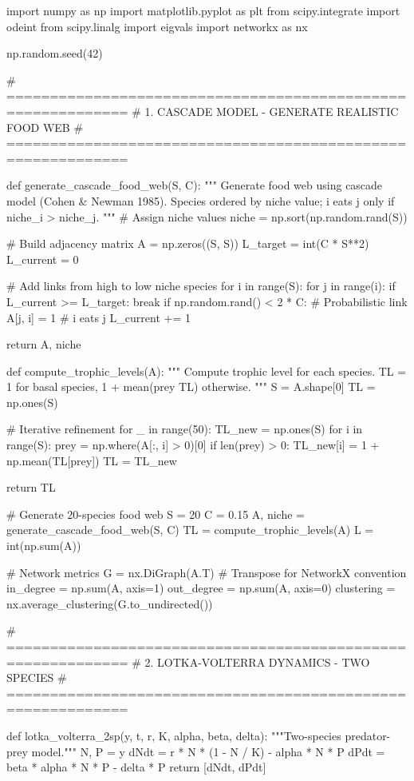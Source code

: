 \documentclass[a4paper, 11pt]{article}
\begin{document}
\begin{pycode}
import numpy as np
import matplotlib.pyplot as plt
from scipy.integrate import odeint
from scipy.linalg import eigvals
import networkx as nx

np.random.seed(42)

# ============================================================
# 1. CASCADE MODEL - GENERATE REALISTIC FOOD WEB
# ============================================================

def generate_cascade_food_web(S, C):
    """
    Generate food web using cascade model (Cohen & Newman 1985).
    Species ordered by niche value; i eats j only if niche_i > niche_j.
    """
    # Assign niche values
    niche = np.sort(np.random.rand(S))

    # Build adjacency matrix
    A = np.zeros((S, S))
    L_target = int(C * S**2)
    L_current = 0

    # Add links from high to low niche species
    for i in range(S):
        for j in range(i):
            if L_current >= L_target:
                break
            if np.random.rand() < 2 * C:  # Probabilistic link
                A[j, i] = 1  # i eats j
                L_current += 1

    return A, niche

def compute_trophic_levels(A):
    """
    Compute trophic level for each species.
    TL = 1 for basal species, 1 + mean(prey TL) otherwise.
    """
    S = A.shape[0]
    TL = np.ones(S)

    # Iterative refinement
    for _ in range(50):
        TL_new = np.ones(S)
        for i in range(S):
            prey = np.where(A[:, i] > 0)[0]
            if len(prey) > 0:
                TL_new[i] = 1 + np.mean(TL[prey])
        TL = TL_new

    return TL

# Generate 20-species food web
S = 20
C = 0.15
A, niche = generate_cascade_food_web(S, C)
TL = compute_trophic_levels(A)
L = int(np.sum(A))

# Network metrics
G = nx.DiGraph(A.T)  # Transpose for NetworkX convention
in_degree = np.sum(A, axis=1)
out_degree = np.sum(A, axis=0)
clustering = nx.average_clustering(G.to_undirected())

# ============================================================
# 2. LOTKA-VOLTERRA DYNAMICS - TWO SPECIES
# ============================================================

def lotka_volterra_2sp(y, t, r, K, alpha, beta, delta):
    """Two-species predator-prey model."""
    N, P = y
    dNdt = r * N * (1 - N / K) - alpha * N * P
    dPdt = beta * alpha * N * P - delta * P
    return [dNdt, dPdt]


\end{pycode}
\end{document}
